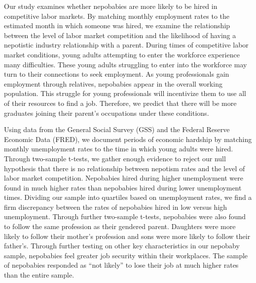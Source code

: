 \documentclass[12pt]{article}
\begin{document}
Our study examines whether nepobabies are more likely to be hired in competitive labor markets. By matching monthly employment rates to the estimated month in which someone was hired, we examine the relationship between the level of labor market competition and the likelihood of having a nepotistic industry relationship with a parent.
During times of competitive labor market conditions, young adults attempting to enter the workforce experience many difficulties. These young adults struggling to enter into the workforce may turn to their connections to seek employment. As young professionals gain employment through relatives, nepobabies appear in the overall working population. This struggle for young professionals will incentivize them to use all of their resources to find a job. Therefore, we predict that there will be more graduates joining their parent’s occupations under these conditions. 


Using data from the General Social Survey (GSS) and the Federal Reserve Economic Data (FRED), we document periods of economic hardship by matching monthly unemployment rates to the time in which young adults were hired. Through two-sample t-tests, we gather enough evidence to reject our null hypothesis that there is no relationship between nepotism rates and the level of labor market competition. Nepobabies hired during higher unemployment were found in much higher rates than nepobabies hired during lower unemployment times. Dividing our sample into  quartiles based on unemployment rates, we find a firm discrepancy between the rates of nepobabies hired in low versus high unemployment. Through further two-sample t-tests, nepobabies were also found to follow the same profession as their gendered parent. Daughters were more likely to follow their mother's profession and sons were more likely to follow their father's. Through further testing on other key characteristics in our nepobaby sample, nepobabies feel greater job security within their workplaces. The sample of nepobabies responded as “not likely” to lose their job at much higher rates than the entire sample. 
\end{document}
